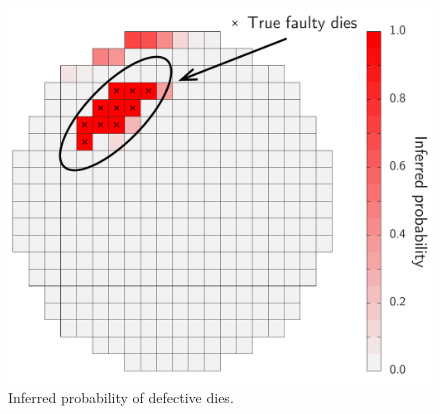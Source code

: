 \begin{figure}[t!]
  \centering
  \includegraphics[width=0.6\linewidth]{include/assets/wafer-defect.pdf}
  \caption{Inferred probability of defective dies.}
  \vspace{-1.5em}
\end{figure}
